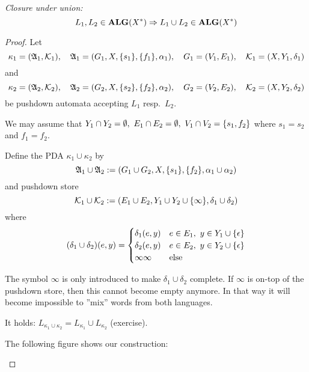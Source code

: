 {\em Closure under union:}
\[ L_1, L_2 \in \mbox{{\bf ALG}}(X^*) \Rightarrow L_1 \cup L_2 \in \mbox{{\bf ALG}}(X^*) \]
\begin{proof}
Let
\[ \kappa_1 = (\mbox{$\mathfrak{A}$}_1,\mbox{$\mathcal{K}$}_1),\quad \mbox{$\mathfrak{A}$}_1 = (G_1, X,
\mbox{$\{s_1\}$}, \mbox{$\{f_1\}$}, \alpha_1),\quad G_1 = (V_1, E_1),\quad \mbox{$\mathcal{K}$}_1 =
(X, Y_1, \delta_1)
\]
and
\[ \kappa_2 = (\mbox{$\mathfrak{A}$}_2,\mbox{$\mathcal{K}$}_2),\quad \mbox{$\mathfrak{A}$}_2 = (G_2, X,
\mbox{$\{s_2\}$}, \mbox{$\{f_2\}$}, \alpha_2),\quad G_2 = (V_2, E_2),\quad \mbox{$\mathcal{K}$}_2 =
(X, Y_2, \delta_2)
\]
be pushdown automata accepting $L_1$ resp.\ $L_2$.

We may assume that $Y_1 \cap Y_2 = \emptyset,\ E_1 \cap E_2 =
\emptyset,\ V_1 \cap V_2 = \mbox{$\{s_1, f_2\}$}$ where $s_1 = s_2$ and $f_1 = f_2$.

Define the PDA $\kappa_1 \cup \kappa_2$ by
\[ \mbox{$\mathfrak{A}$}_1 \cup \mbox{$\mathfrak{A}$}_2 := (G_1 \cup G_2, X, \mbox{$\{s_1\}$}, \mbox{$\{f_2\}$},
\alpha_1 \cup \alpha_2) \]
and pushdown store
\[ \mbox{$\mathcal{K}$}_1 \cup \mbox{$\mathcal{K}$}_2 := (E_1 \cup E_2, Y_1 \cup Y_2 \cup
\mbox{$\{\infty\}$}, \delta_1 \cup \delta_2) \]
where
\[ (\delta_1 \cup \delta_2)(e, y) = \begin{cases}
\delta_1(e, y) & e \in E_1,\ y \in Y_1 \cup \mbox{$\{\epsilon\}$} \\ 
\delta_2(e, y) & e \in E_2,\ y \in Y_2 \cup \mbox{$\{\epsilon\}$} \\
\infty\infty & \text{else} 
\end{cases}
\]

The symbol $\infty$ is only introduced to make $\delta_1 \cup \delta_2$
complete. If $\infty$ is on-top of the pushdown store, then this cannot become
empty anymore. In that way it will become impossible to ''mix'' words from both
languages.

It holds: $L_{\kappa_1 \cup \kappa_2} = L_{\kappa_1} \cup L_{\kappa_2}$
(exercise).

The following figure shows our construction:

\begin{center}

\end{center}
\end{proof}


